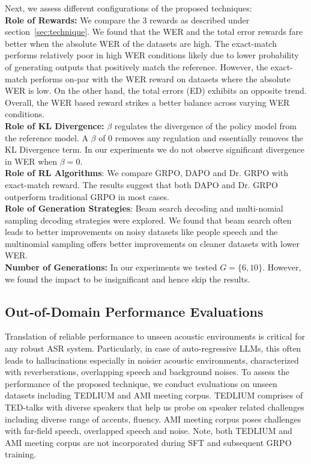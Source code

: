 \documentclass[conference]{IEEEtran}
\begin{document}
Next, we assess different configurations of the proposed techniques:\\
\textbf{Role of Rewards:} We compare the 3 rewards as described under section~\ref{sec:technique}. We found that the WER and the total error rewards fare better when the absolute WER of the datasets are high. The exact-match performs relatively poor in high WER conditions likely due to lower probability of generating outputs that positively match the reference. However, the exact-match performs on-par with the WER reward on datasets where the absolute WER is low. On the other hand, the total errors (ED) exhibits an opposite trend. Overall, the WER based reward strikes a better balance across varying WER conditions.\\
\textbf{Role of KL Divergence:} $\beta$ regulates the divergence of the policy model from the reference model. A $\beta$ of 0 removes any regulation and essentially removes the KL Divergence term. In our experiments we do not observe significant divergence in WER when $\beta=0$.\\
\textbf{Role of RL Algorithms}: We compare GRPO, DAPO and Dr. GRPO with exact-match reward. The results suggest that both DAPO and Dr. GRPO outperform traditional GRPO in most cases.\\
\textbf{Role of Generation Strategies}: Beam search decoding and multi-nomial sampling decoding strategies were explored. We found that beam search often leads to better improvements on noisy datasets like people speech and the multinomial sampling offers better improvements on cleaner datasets with lower WER.\\
\textbf{Number of Generations:} In our experiments we tested $G=\{6,10\}$. However, we found the impact to be insignificant and hence skip the results.

\subsection{Out-of-Domain Performance Evaluations}
Translation of reliable performance to unseen acoustic environments is critical for any robust ASR system.
Particularly, in case of auto-regressive LLMs, this often leads to hallucinations especially in noisier acoustic environments, characterized with reverberations, overlapping speech and background noises.
To assess the performance of the proposed technique, we conduct evaluations on unseen datasets including TEDLIUM and AMI meeting corpus.
TEDLIUM comprises of TED-talks with diverse speakers that help us probe on speaker related challenges including diverse range of accents, fluency. 
AMI meeting corpus poses challenges with far-field speech, overlapped speech and noise. 
Note, both TEDLIUM and AMI meeting corpus are not incorporated during SFT and subsequent GRPO training.
\end{document}
